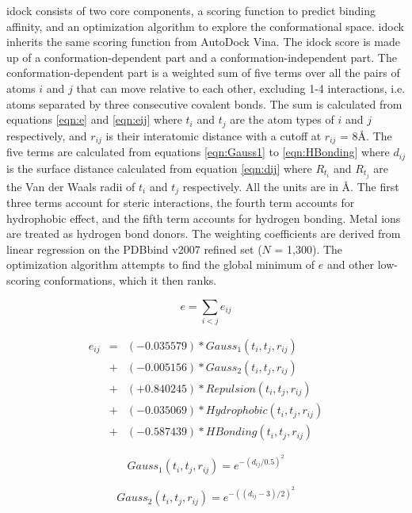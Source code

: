 idock consists of two core components, a scoring function to predict binding affinity, and an optimization algorithm to explore the conformational space. idock inherits the same scoring function from AutoDock Vina. The idock score is made up of a conformation-dependent part and a conformation-independent part. The conformation-dependent part is a weighted sum of five terms over all the pairs of atoms $i$ and $j$ that can move relative to each other, excluding 1-4 interactions, i.e. atoms separated by three consecutive covalent bonds. The sum is calculated from equations \eqref{eqn:e} and \eqref{eqn:eij} where $t_i$ and $t_j$ are the atom types of $i$ and $j$ respectively, and $r_{ij}$ is their interatomic distance with a cutoff at $r_{ij}$ = 8\AA. The five terms are calculated from equations \eqref{eqn:Gauss1} to \eqref{eqn:HBonding} where $d_{ij}$ is the surface distance calculated from equation \eqref{eqn:dij} where $R_{t_i}$ and $R_{t_j}$ are the Van der Waals radii of $t_i$ and $t_j$ respectively. All the units are in \AA. The first three terms account for steric interactions, the fourth term accounts for hydrophobic effect, and the fifth term accounts for hydrogen bonding. Metal ions are treated as hydrogen bond donors. The weighting coefficients are derived from linear regression on the PDBbind \citep{529,530} v2007 refined set ($N$ = 1,300). The optimization algorithm attempts to find the global minimum of $e$ and other low-scoring conformations, which it then ranks.

\begin{equation}
\label{eqn:e}
e = \sum_{i < j} e_{ij}
\end{equation}

\begin{eqnarray}
\label{eqn:eij}
e_{ij} &=& (-0.035579) * Gauss_1(t_i, t_j, r_{ij}) \nonumber \\
       &+& (-0.005156) * Gauss_2(t_i, t_j, r_{ij}) \nonumber \\
       &+& (+0.840245) * Repulsion(t_i, t_j, r_{ij}) \nonumber \\
       &+& (-0.035069) * Hydrophobic(t_i, t_j, r_{ij}) \nonumber \\
       &+& (-0.587439) * HBonding(t_i, t_j, r_{ij})
\end{eqnarray}

\begin{equation}
\label{eqn:Gauss1}
Gauss_1(t_i, t_j, r_{ij}) = e^{-(d_{ij} / 0.5)^2}
\end{equation}

\begin{equation}
\label{eqn:Gauss2}
Gauss_2(t_i, t_j, r_{ij}) = e^{-((d_{ij} - 3) / 2)^2}
\end{equation}

